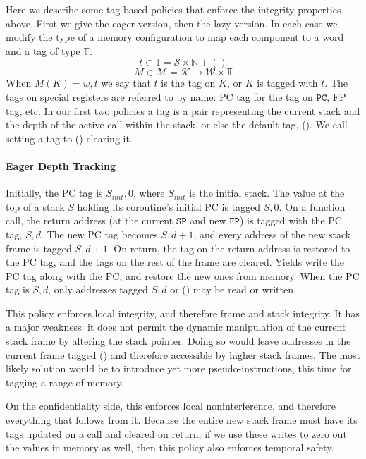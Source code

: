 \documentclass{article}
\begin{document}
    Here we describe some tag-based policies that enforce the integrity properties above. First we give the eager
    version, then the lazy version. In each case we modify the type of a memory configuration to map each component to a
    word and a tag of type \(\mathbb{T}\).
    \[t \in \mathbb{T} = \mathcal{S} \times \mathbb{N} + ()\]
    \[M \in \mathcal{M} = \mathcal{K} \rightarrow \mathcal{W} \times \mathbb{T}\]
    When \(M(K) = w,t\) we say that \(t\) is the tag on \(K\), or \(K\) is tagged with \(t\).
    The tags on special registers are referred to by name: PC tag for the tag on \(\mathtt{PC}\), FP tag, etc.
    In our first two policies a tag is a pair representing the current stack and the depth of the active call within
    the stack, or else the default tag, (). We call setting a tag to () clearing it.

    \paragraph{Eager Depth Tracking}

      Initially, the PC tag is \(S_{init},0\), where \(S_{init}\) is the initial stack. The value at the top of
      a stack \(S\) holding its coroutine's initial PC is tagged \(S,0\).
      On a function call, the return address (at the current \(\mathtt{SP}\) and new \(\mathtt{FP}\)) is tagged with
      the PC tag, \(S,d\). The new PC tag becomes \(S,d+1\), and every address of the new stack frame is tagged
      \(S,d+1\). On return, the tag on the return address is restored to the PC tag, and the tags on the rest of the
      frame are cleared. Yields write the PC tag along with the PC, and restore the new ones from memory.
      When the PC tag is \(S,d\), only addresses tagged \(S,d\) or () may be read or written.

      This policy enforces local integrity, and therefore frame and stack integrity. It has a major weakness: it
      does not permit the dynamic manipulation of the current stack frame by altering the stack pointer. Doing
      so would leave addresses in the current frame tagged () and therefore accessible by higher stack frames.
      The most likely solution would be to introduce yet more pseudo-instructions, this time for tagging a range
      of memory.

      On the confidentiality side, this enforces local noninterference, and therefore everything that follows
      from it. Because the entire new stack frame must have its tags updated on a call and cleared on return, if we
      use these writes to zero out the values in memory as well, then this policy also enforces temporal safety.
\end{document}
